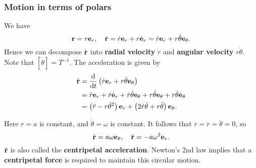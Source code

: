 \subsubsection*{Motion in terms of polars}
We have
\[
    {\bf r} = r{\bf e}_r,\quad \dot{{\bf r}} = \dot{r} {\bf e}_r + r \dot{{\bf e}}_r = \dot{r}{\bf e}_r+r\dot{\theta}{\bf e}_\theta.
\]
Hence we can decompose $ \dot{{\bf r}} $ into \textbf{radial velocity} $ \dot{r} $ and \textbf{angular velocity} $ r\dot{\theta} $. Note that $ [\dot{\theta}] = T^{-1} $. The acceleration is given by
\begin{align*}
    \ddot{{\bf r}} &= \frac{\mathrm{d}}{\mathrm{d}t}\left( \dot{r}{\bf e}_r+r\dot{\theta}{\bf e}_\theta  \right)\\
    &=  \ddot{r}{\bf e}_r+\dot{r}\dot{{\bf e}}_r+\dot{r}\dot{\theta}{\bf e}_\theta+r \ddot{\theta}{\bf e}_\theta+r \dot{\theta}\dot{{\bf e}}_\theta\\ 
    &= \left( \ddot{r}-r\dot{\theta}^2 \right){\bf e}_r+\left( 2 \dot{r}\dot{\theta}+r \ddot{\theta} \right){\bf e}_\theta.
\end{align*}
\begin{example}
    Here $ r=a $ is constant, and $ \dot{\theta} = \omega $ is constant. It follows that $ \dot{r}=\ddot{r}=\ddot{\theta}=0 $, so 
    \[
        \dot{{\bf r}} = a \omega {\bf e}_\theta,\quad \ddot{{\bf r}} = -a\omega^2{\bf e}_r.
    \]
    $ \ddot{{\bf r}} $ is also called the \textbf{centripetal acceleration}. Newton's 2nd law implies that a \textbf{centripetal force} is required to maintain this circular motion.

    \begin{center}
    \end{center}
\end{example}

